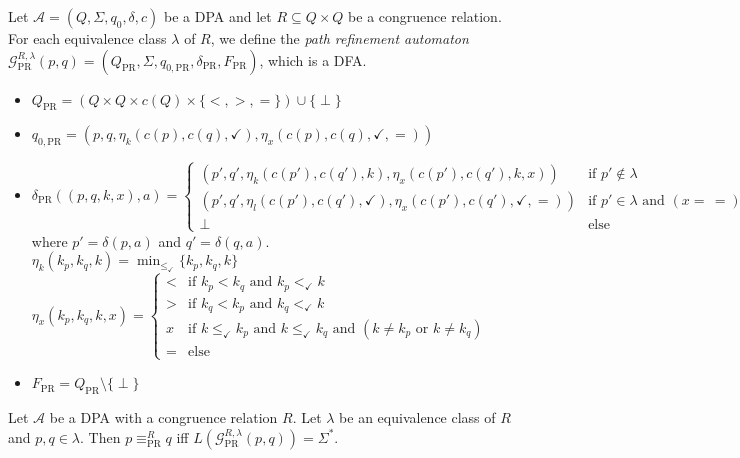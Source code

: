 \begin{defn}
	Let $\mathcal{A} = (Q, \Sigma, q_0, \delta, c)$ be a DPA and let $R \subseteq Q \times Q$ be a congruence relation. For each equivalence class $\lambda$ of $R$, we define the \emph{path refinement automaton} $\mathcal{G}_\text{PR}^{R,\lambda}(p, q) = (Q_\text{PR}, \Sigma, q_{0, \text{PR}}, \delta_\text{PR}, F_\text{PR})$, which is a DFA.
	
	\begin{itemize}
		\item $Q_\text{PR} = (Q \times Q \times c(Q) \times \{<, >, =\}) \cup \{ \perp \}$
		\item $q_{0, \text{PR}} = (p, q, \eta_k(c(p), c(q), \checkmark), \eta_x(c(p), c(q), \checkmark, =))$
		\item $\delta_\text{PR}((p, q, k, x), a) = \begin{cases}
			(p', q', \eta_k(c(p'), c(q'), k), \eta_x(c(p'), c(q'), k, x)) & \text{if } p' \notin \lambda \\
			(p', q', \eta_l(c(p'), c(q'), \checkmark), \eta_x(c(p'), c(q'), \checkmark, =)) & \text{if } p' \in \lambda \text{ and } (x =\, =) \\
			\perp & \text{else}
		\end{cases}$ \\
			where $p' = \delta(p, a)$ and $q' = \delta(q, a)$. \\
			$\eta_k(k_p, k_q, k) = \min_{\leq_\checkmark} \{k_p, k_q, k\}$ \\
			$\eta_x(k_p, k_q, k, x) = \begin{cases}
				< & \text{if } k_p < k_q \text{ and } k_p <_\checkmark k \\
				> & \text{if } k_q < k_p \text{ and } k_q <_\checkmark k \\
				x & \text{if } k \leq_\checkmark k_p \text{ and } k \leq_\checkmark k_q \text{ and } (k \neq k_p \text{ or } k \neq k_q) \\
				= & \text{else}
			\end{cases}$ %
		\item $F_\text{PR} = Q_\text{PR} \setminus \{\perp\}$
	\end{itemize}
\end{defn}

\begin{theorem}
	Let $\mathcal{A}$ be a DPA with a congruence relation $R$. Let $\lambda$ be an equivalence class of $R$ and $p, q \in \lambda$. Then $p \equiv_\text{PR}^R q$ iff $L(\mathcal{G}_\text{PR}^{R,\lambda}(p, q)) = \Sigma^*$.
\end{theorem}


